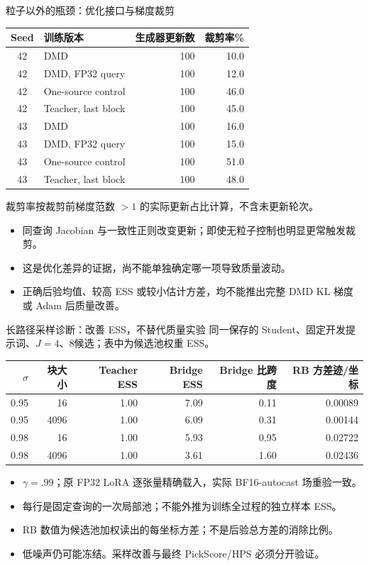 \documentclass[10pt,aspectratio=169]{beamer}
\begin{document}
\begin{frame}{粒子以外的瓶颈：优化接口与梯度裁剪}
\scriptsize\centering
\begin{tabular}{clrr}\toprule
Seed & 训练版本 & 生成器更新数 & 裁剪率\%\\\midrule
42 & DMD & 100 & 10.0 \\
42 & DMD, FP32 query & 100 & 12.0 \\
42 & One-source control & 100 & 46.0 \\
42 & Teacher, last block & 100 & 45.0 \\
43 & DMD & 100 & 16.0 \\
43 & DMD, FP32 query & 100 & 15.0 \\
43 & One-source control & 100 & 51.0 \\
43 & Teacher, last block & 100 & 48.0 \\
\bottomrule\end{tabular}\par\raggedright\vspace{6pt}
裁剪率按裁剪前梯度范数 $>1$ 的实际更新占比计算，不含未更新轮次。
\begin{itemize}\itemsep4pt
\item 同查询 Jacobian 与一致性正则改变更新；即使无粒子控制也明显更常触发裁剪。
\item 这是优化差异的证据，尚不能单独确定哪一项导致质量波动。
\item 正确后验均值、较高 ESS 或较小估计方差，均不能推出完整 DMD KL 梯度或 Adam 后质量改善。
\end{itemize}
\end{frame}
\begin{frame}{长路径采样诊断：改善 ESS，不替代质量实验}
\footnotesize\centering
同一保存的 Student、固定开发提示词、$J=4$、8候选；表中为候选池权重 ESS。
\begin{tabular}{rrrrrr}\toprule
$\sigma$ & 块大小 & Teacher ESS & Bridge ESS & Bridge 比跨度 & RB 方差迹/坐标\\\midrule
0.95 & 16 & 1.00 & 7.09 & 0.11 & 0.00089 \\
0.95 & 4096 & 1.00 & 6.09 & 0.31 & 0.00144 \\
0.98 & 16 & 1.00 & 5.93 & 0.95 & 0.02722 \\
0.98 & 4096 & 1.00 & 3.61 & 1.60 & 0.02436 \\
\bottomrule\end{tabular}\par\raggedright\vspace{5pt}
\begin{itemize}\itemsep5pt
\item $\gamma=.99$；原 FP32 LoRA 逐张量精确载入，实际 BF16-autocast 场重验一致。
\item 每行是固定查询的一次局部池；不能外推为训练全过程的独立样本 ESS。
\item RB 数值为候选池加权读出的每坐标方差；不是后验总方差的消除比例。
\item 低噪声仍可能冻结。采样改善与最终 PickScore/HPS 必须分开验证。
\end{itemize}
\end{frame}
\end{document}
